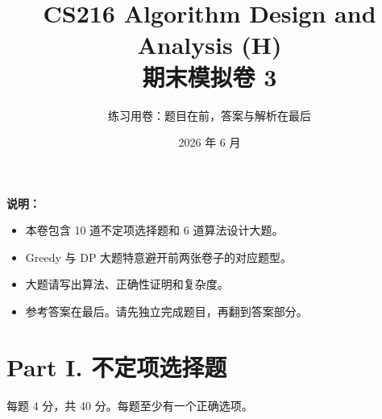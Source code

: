 \documentclass[UTF8,a4paper,11pt]{ctexart}
\title{\textbf{CS216 Algorithm Design and Analysis (H)\\期末模拟卷 3}}
\author{练习用卷：题目在前，答案与解析在最后}
\date{2026 年 6 月}
\begin{document}
\maketitle

\textbf{说明：}
\begin{itemize}
  \item 本卷包含 10 道不定项选择题和 6 道算法设计大题。
  \item Greedy 与 DP 大题特意避开前两张卷子的对应题型。
  \item 大题请写出算法、正确性证明和复杂度。
  \item 参考答案在最后。请先独立完成题目，再翻到答案部分。
\end{itemize}

\section*{Part I. 不定项选择题}

每题 4 分，共 40 分。每题至少有一个正确选项。
\end{document}
